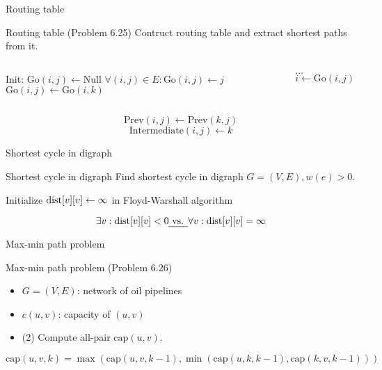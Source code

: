 \begin{frame}{Routing table}
  \begin{exampleblock}{Routing table (Problem 6.25)}
	Contruct routing table and extract shortest paths from it.
  \end{exampleblock}

  \begin{columns}
	  \begin{algorithmic}
		\State Init: $\text{Go}(i,j) \gets \text{Null}$
		\Statex
		\State $\forall (i,j) \in E: \text{Go}(i,j) \gets j$
		\Statex
		\If{$\dots$}
		  \State $\text{Go}(i,j) \gets \text{Go}(i,k)$
		\EndIf
	  \end{algorithmic}
	\column{0.50\textwidth}
	  \begin{algorithmic}
		\If{$Go(i,j) = \text{Null}$}
		  \State $\dots$
		\EndIf
		\Statex
		\While{$i \neq j$}
		  \State $i \gets \text{Go}(i,j)$
		\EndWhile
	  \end{algorithmic}
  \end{columns}

  \vspace{0.50cm}
  \[
	\text{Prev}(i,j) \gets \text{Prev}(k,j)
  \]
  \[
	\text{Intermediate}(i,j) \gets k
  \]
\end{frame}
\begin{frame}{Shortest cycle in digraph}
  \begin{exampleblock}{Shortest cycle in digraph}
	Find shortest cycle in digraph $G = (V, E), w(e) > 0$.
  \end{exampleblock}

  \vspace{0.50cm}
  \centerline{Initialize $\text{dist}[v][v] \gets \infty$ in Floyd-Warshall algorithm} 

  \[
	\exists v: \text{dist}[v][v] < 0 \text{\emph { vs. }} \forall v: \text{dist}[v][v] = \infty
  \]
\end{frame}
\begin{frame}{Max-min path problem}
  \begin{exampleblock}{Max-min path problem (Problem 6.26)}
	\begin{itemize}
	  \item $G = (V, E)$: network of oil pipelines
	  \item $c(u,v)$: capacity of $(u,v)$
	  \item (2) Compute all-pair $\text{cap}(u,v)$.
	\end{itemize}
  \end{exampleblock}

  \[
	\text{cap}(u,v,k) = \max(\text{cap}(u,v,k-1), \min(\text{cap}(u,k,k-1), \text{cap}(k,v,k-1)))
  \]
\end{frame}
